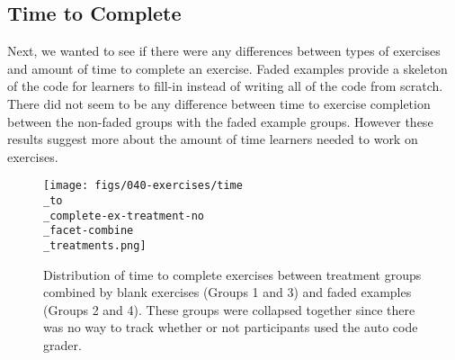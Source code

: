 \documentclass[040-assessment.tex]{subfiles}
\begin{document}
\subsection{Time to Complete}

    Next, we wanted to see if there were any differences between types of exercises and amount of time to complete an exercise.
    Faded examples provide a skeleton of the code for learners to fill-in instead of writing all of the code from scratch.
    There did not seem to be any difference between time to exercise completion between the non-faded groups with the
    faded example groups.
    However these results suggest more about the amount of time learners needed to work on exercises.

    \begin{figure}[!hbtp]
        \centering
        \texttt{[image: figs/040-exercises/time\\\_to\\\_complete-ex-treatment-no\\\_facet-combine\\\_treatments.png]}
        \caption[Time to complete exercises with combined treatment groups]
        {Distribution of time to complete exercises between treatment groups combined by
        blank exercises (Groups 1 and 3) and faded examples (Groups 2 and 4).
        These groups were collapsed together since there was no way to track whether or not
        participants used the auto code grader.
        }
        \label{fig:time-to-complete-combined-treatments}
    \end{figure}
\end{document}
